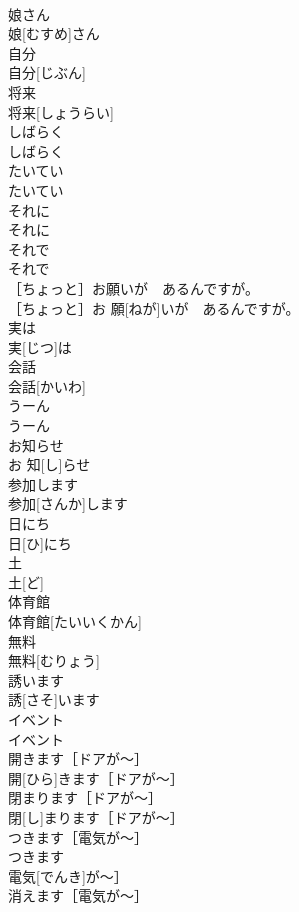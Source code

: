 \documentclass[8pt]{extreport}
\begin{document}
\begin{CJK}{UTF8}{min}
\\	娘さん	
\\	娘[むすめ]さん	
\\	自分	
\\	自分[じぶん]	
\\	将来	
\\	将来[しょうらい]	
\\	しばらく	
\\	しばらく	
\\	たいてい	
\\	たいてい	
\\	それに	
\\	それに	
\\	それで	
\\	それで	
\\	［ちょっと］お願いが　あるんですが。	
\\	［ちょっと］お 願[ねが]いが　あるんですが。	
\\	実は	
\\	実[じつ]は	
\\	会話	
\\	会話[かいわ]	
\\	うーん	
\\	うーん	
\\	お知らせ	
\\	お 知[し]らせ	
\\	参加します	
\\	参加[さんか]します	
\\	日にち	
\\	日[ひ]にち	
\\	土	
\\	土[ど]	
\\	体育館	
\\	体育館[たいいくかん]	
\\	無料	
\\	無料[むりょう]	
\\	誘います	
\\	誘[さそ]います	
\\	イベント	
\\	イベント	
\\	開きます［ドアが〜］	
\\	開[ひら]きます［ドアが〜］	
\\	閉まります［ドアが〜］	
\\	閉[し]まります［ドアが〜］	
\\	つきます［電気が〜］	
\\	つきます
\\	電気[でんき]が〜］	
\\	消えます［電気が〜］	

\end{CJK}
\end{document}
